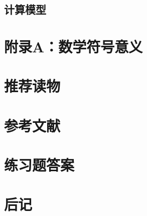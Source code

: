\documentclass[UTF8]{ctexbook}
\begin{document}
        \section{计算模型}
    \newpage
    \chapter{附录A：数学符号意义}
    \chapter{推荐读物}
    \chapter{参考文献}
    \chapter{练习题答案}
    \chapter{后记}
\end{document}
